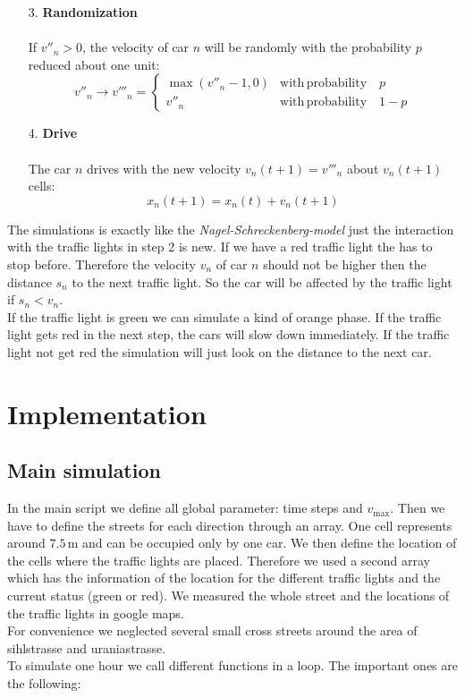 \documentclass[11pt]{article}
\begin{document}
\begin{itemize}
\begin{itemize}
\end{itemize}
\item[3.]  \textbf{Randomization}\\
\\
If $v''_n>0$, the velocity of car $n$ will be randomly with the probability $p$ reduced about one unit:
\begin{equation}
v''_n \rightarrow v'''_n=
\begin{cases}
\max(v''_n-1,0) & \mathrm{with\,probability} \quad p\\
v''_n & \mathrm{with\,probability} \quad 1-p
\end{cases}
\label{hangb}
\end{equation}
\item[4.] \textbf{Drive}\\
\\
The car $n$ drives with the new velocity $v_n(t+1)=v'''_n$ about $v_n(t+1)$ cells:
\begin{equation}
x_n(t+1)=x_n(t)+v_n(t+1)
\label{drive}
\end{equation}
\end{itemize}
The simulations is exactly like the \textit{Nagel-Schreckenberg-model} just the interaction with the traffic lights in step 2 is new. If we have a red traffic light the has to stop before. Therefore the velocity $v_n$ of car $n$ should not be higher then the distance $s_n$ to the next traffic light. So the car will be affected by the traffic light if $s_n<v_n$.\\
If the traffic light is green we can simulate a kind of orange phase. If the traffic light gets red in the next step, the cars will slow down immediately. If the traffic light not get red the simulation will just look on the distance to the next car.

\section{Implementation}

\subsection{Main simulation}

In the main script we define all global parameter: time steps and $v_\mathrm{max}$. Then we have to define the streets for each direction through an array. One cell represents around $7.5\,\mathrm{m}$ and can be occupied only by one car. We then define the location of the cells where the traffic lights are placed. Therefore we used a second array which has the information of the location for the different traffic lights and the current status (green or red). We measured the whole street and the locations of the traffic lights in google maps.\\
For convenience we neglected several small cross streets around the area of sihlstrasse and uraniastrasse.\\
To simulate one hour we call different functions in a loop. The important ones are the following:
\end{document}
